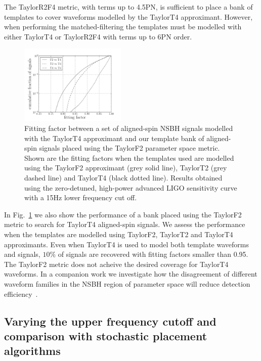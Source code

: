 The TaylorR2F4 metric, with terms up to
4.5\ac{PN}, is sufficient to place
a bank of templates to cover waveforms modelled by the TaylorT4 approximant.
However, when performing the
matched-filtering the templates must be modelled with either TaylorT4 or
TaylorR2F4 with terms up to 6\ac{PN} order.

\begin{figure}
\includegraphics[width=0.45\textwidth]
{papers/nsbh_effectualness/figure5.pdf}
\caption{\label{fig:bankF2T4testing}
Fitting factor between a set of aligned-spin \ac{NSBH} signals modelled with the
TaylorT4 approximant and our template bank of aligned-spin signals placed using
the TaylorF2 parameter space metric. Shown are the fitting factors when the
templates used are modelled using the TaylorF2 approximant (grey solid line),
TaylorT2 (grey dashed line) and TaylorT4 (black dotted line). Results obtained
using the zero-detuned, high-power advanced LIGO sensitivity curve with a 15Hz
lower frequency cut off.
}
\end{figure}

In Fig.~\ref{fig:bankF2T4testing} we also show the performance of a bank
placed using the TaylorF2 metric to search for TaylorT4 aligned-spin signals.
We assess the performance when the templates are modelled using TaylorF2,
TaylorT2 and TaylorT4 approximants. Even when TaylorT4 is used to model both
template waveforms and signals, $10\%$ of signals are recovered with fitting
factors smaller than 0.95. The TaylorF2 metric does not acheive the desired
coverage for TaylorT4 waveforms. In a companion work we investigate how the 
disagreement of different waveform families in the \ac{NSBH} region of 
parameter space will reduce detection efficiency~\cite{Nitz:2013mxa}.

\subsection{Varying the upper frequency cutoff and comparison with stochastic
placement algorithms}
\label{ssec:stoch_fup_compare}

